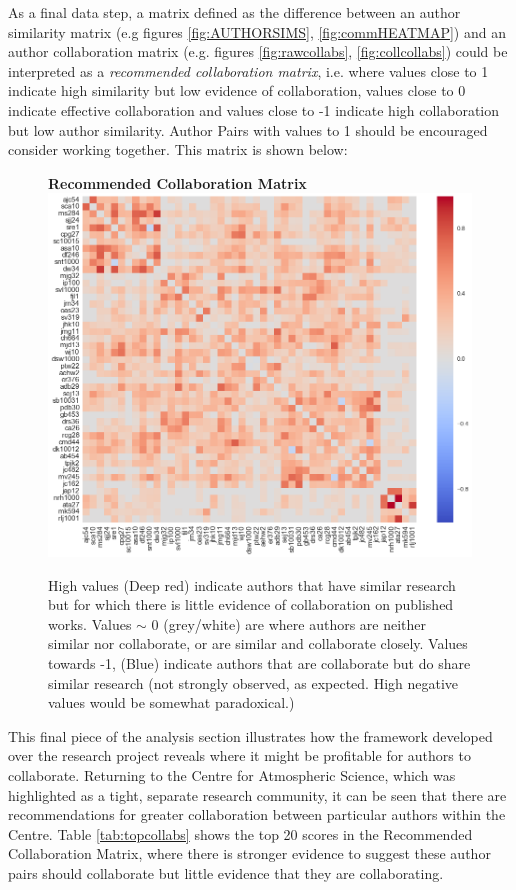 As a final data step, a matrix defined as the difference between an author similarity matrix (e.g figures \ref{fig:AUTHORSIMS}, \ref{fig:commHEATMAP}) and an author collaboration matrix (e.g. figures \ref{fig:rawcollabs}, \ref{fig:collcollabs}) could be interpreted as a \emph{recommended collaboration matrix}, i.e. where values close to 1 indicate high similarity but low evidence of collaboration, values close to 0 indicate effective collaboration and values close to -1 indicate high collaboration but low author similarity. Author Pairs with values to 1 should be encouraged consider working together. This matrix is shown below:
\begin{center}
\begin{figure}[H]
  \centering
  \textbf{Recommended Collaboration Matrix}
    \includegraphics[width=\textwidth]{Analysis/Recommending_Mat.png}
    \caption[Recommended Collaboration Matrix]{High values (Deep red) indicate authors that have similar research but for which there is little evidence of collaboration on published works. Values $\sim$ 0 (grey/white) are where authors are neither similar nor collaborate, or are similar and collaborate closely. Values towards -1, (Blue) indicate authors that are collaborate but do share similar research (not strongly observed, as expected. High negative values would be somewhat paradoxical.) }
    \label{fig:RECOMM_MAT}

\end{figure} 
\end{center}
This final piece of the analysis section illustrates how the framework developed over the research project reveals where it might be profitable for authors to collaborate. Returning to the Centre for Atmospheric Science, which was highlighted as a tight, separate research community, it can be seen that there are recommendations for greater collaboration between particular authors within the Centre. Table \ref{tab:topcollabs} shows the top 20 scores in the Recommended Collaboration Matrix, where there is stronger evidence to suggest these author pairs should collaborate but little evidence that they are collaborating.

